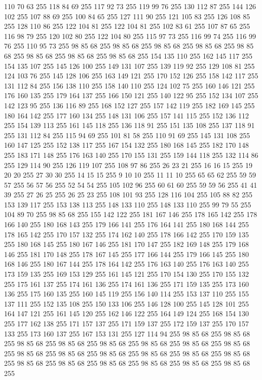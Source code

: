110 70 63 255 118 84 69 255 117 92 73 255 119 99 76 255 130 112 87 255 144 126 102 255 107 88 69 255 100 84 65 255 127 111 90 255 121 105 83 255 126 108 85 255 128 110 86 255 122 104 81 255 122 104 81 255 102 83 61 255 107 87 65 255 116 98 79 255 120 102 80 255 122 104 80 255 115 97 73 255 116 99 74 255 116 99 76 255 110 95 73 255 98 85 68 255 98 85 68 255 98 85 68 255 98 85 68 255 98 85 68 255 98 85 68 255 98 85 68 255 98 85 68 255 154 135 110 255 162 145 117 255 154 135 107 255 145 126 100 255 149 131 107 255 139 119 92 255 129 108 81 255 124 103 76 255 145 128 106 255 163 149 121 255 170 152 126 255 158 142 117 255 131 112 84 255 156 138 110 255 158 140 110 255 124 102 75 255 160 146 121 255 176 160 135 255 179 164 137 255 166 150 121 255 140 122 95 255 152 134 107 255 142 123 95 255 136 116 89 255 168 152 127 255 157 142 119 255 182 169 145 255 180 164 142 255 177 160 134 255 148 131 106 255 157 141 115 255 152 136 112 255 154 139 113 255
161 145 118 255 136 118 91 255 151 135 108 255 137 118 91 255 131 112 84 255 115 94 69 255 101 81 58 255 110 91 69 255 145 131 108 255 160 147 125 255 152 138 117 255 167 154 132 255 180 168 145 255 182 170 148 255 183 171 148 255 176 163 140 255 170 155 131 255 159 144 118 255 132 114 86 255 129 114 90 255 126 119 107 255 108 97 86 255 26 23 21 255 16 16 15 255 19 20 20 255 27 30 30 255 14 15 15 255 9 10 10 255 11 11 10 255 65 65 62 255 59 59 57 255 56 57 56 255 52 54 54 255 105 102 96 255 60 61 60 255 59 59 56 255 41 41 39 255 27 26 25 255 26 25 23 255 108 101 93 255 128 116 104 255 105 88 82 255 153 139 117 255 153 138 113 255 148 133 110 255 148 133 110 255 99 79 55 255 104 89 70 255 98 85 68 255 155 142 122 255 181 167 146 255 178 165 142 255 178 166 140 255 180 168 143 255 179 166 141 255 176 164 141 255 180 168 144 255 178 165 142 255 170 157 132 255 174 162 140 255 178 166 142 255 170 159 135 255 180 168 145 255 180 167 146 255
181 170 147 255 182 169 148 255 179 168 146 255 181 170 148 255 178 167 145 255 177 166 144 255 179 166 145 255 180 168 146 255 180 167 144 255 178 164 142 255 176 163 140 255 176 163 140 255 173 159 135 255 169 153 129 255 161 145 121 255 170 154 130 255 170 155 132 255 175 161 137 255 174 161 136 255 174 161 136 255 171 159 135 255 173 160 136 255 175 160 135 255 160 145 119 255 156 140 114 255 153 137 110 255 155 137 111 255 152 135 108 255 150 133 106 255 146 128 100 255 145 128 101 255 164 147 121 255 161 145 120 255 162 146 122 255 164 149 124 255 168 154 130 255 177 162 138 255 171 157 137 255 171 159 137 255 172 159 137 255 170 157 133 255 173 160 137 255 167 153 131 255 127 114 94 255 98 85 68 255 98 85 68 255 98 85 68 255 98 85 68 255 98 85 68 255 98 85 68 255 98 85 68 255 98 85 68 255 98 85 68 255 98 85 68 255 98 85 68 255 98 85 68 255 98 85 68 255 98 85 68 255 98 85 68 255 98 85 68 255 98 85 68 255 98 85 68 255 98 85 68 255 98 85 68 255
